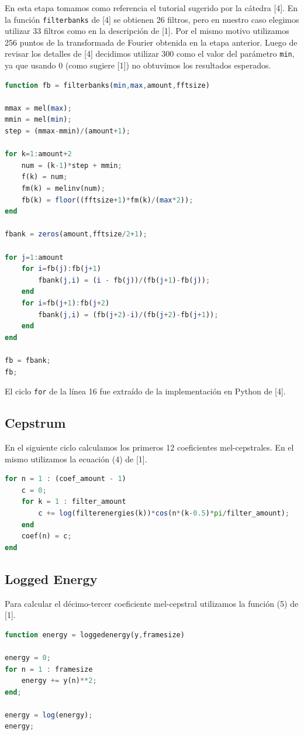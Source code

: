 \documentclass[a4paper,10pt]{article}
\begin{document}
En esta etapa tomamos como referencia el tutorial sugerido por la cátedra [4]. En la función \texttt{filterbanks} de [4] se obtienen 26 filtros, pero en nuestro caso elegimos utilizar 33 filtros como en la descripción de [1]. Por el mismo motivo utilizamos 256 puntos de la transformada de Fourier obtenida en la etapa anterior. 
Luego de revisar los detalles de [4] decidimos utilizar 300 como el valor del parámetro \texttt{min}, ya que usando 0 (como sugiere [1]) no obtuvimos los resultados esperados.
\newline
\begin{lstlisting}[language=Octave, caption = filterbanks]
function fb = filterbanks(min,max,amount,fftsize)

mmax = mel(max);
mmin = mel(min);
step = (mmax-mmin)/(amount+1);

for k=1:amount+2
	num = (k-1)*step + mmin;
	f(k) = num;
	fm(k) = melinv(num);
	fb(k) = floor((fftsize+1)*fm(k)/(max*2));
end

fbank = zeros(amount,fftsize/2+1);

for j=1:amount
	for i=fb(j):fb(j+1)
		fbank(j,i) = (i - fb(j))/(fb(j+1)-fb(j));
	end
	for i=fb(j+1):fb(j+2)
		fbank(j,i) = (fb(j+2)-i)/(fb(j+2)-fb(j+1));
	end
end

fb = fbank;
fb;
\end{lstlisting}
El ciclo \texttt{for} de la línea 16 fue extraído de la implementación en Python de [4].

\subsection{Cepstrum}

En el siguiente ciclo calculamos los primeros 12 coeficientes mel-cepstrales. En el mismo utilizamos la ecuación (4) de [1].
\newline
\begin{lstlisting}[language=Octave, caption = Extracto de la función mfcc]
for n = 1 : (coef_amount - 1)
	c = 0;
	for k = 1 : filter_amount
		c += log(filterenergies(k))*cos(n*(k-0.5)*pi/filter_amount);
	end
	coef(n) = c;
end
\end{lstlisting}

\subsection{Logged Energy}
Para calcular el décimo-tercer coeficiente mel-cepstral utilizamos la función (5) de [1].
\newline
\begin{lstlisting}[language=Octave, caption = Logged Energy]
function energy = loggedenergy(y,framesize)

energy = 0;
for n = 1 : framesize
	energy += y(n)**2;
end;

energy = log(energy);	
energy;
\end{lstlisting}
\end{document}
